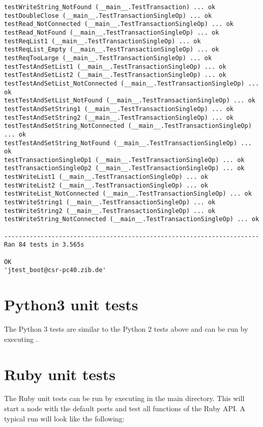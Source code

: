 \begin{lstlisting}[language={}]
testWriteString_NotFound (__main__.TestTransaction) ... ok
testDoubleClose (__main__.TestTransactionSingleOp) ... ok
testRead_NotConnected (__main__.TestTransactionSingleOp) ... ok
testRead_NotFound (__main__.TestTransactionSingleOp) ... ok
testReqList1 (__main__.TestTransactionSingleOp) ... ok
testReqList_Empty (__main__.TestTransactionSingleOp) ... ok
testReqTooLarge (__main__.TestTransactionSingleOp) ... ok
testTestAndSetList1 (__main__.TestTransactionSingleOp) ... ok
testTestAndSetList2 (__main__.TestTransactionSingleOp) ... ok
testTestAndSetList_NotConnected (__main__.TestTransactionSingleOp) ... ok
testTestAndSetList_NotFound (__main__.TestTransactionSingleOp) ... ok
testTestAndSetString1 (__main__.TestTransactionSingleOp) ... ok
testTestAndSetString2 (__main__.TestTransactionSingleOp) ... ok
testTestAndSetString_NotConnected (__main__.TestTransactionSingleOp) ... ok
testTestAndSetString_NotFound (__main__.TestTransactionSingleOp) ... ok
testTransactionSingleOp1 (__main__.TestTransactionSingleOp) ... ok
testTransactionSingleOp2 (__main__.TestTransactionSingleOp) ... ok
testWriteList1 (__main__.TestTransactionSingleOp) ... ok
testWriteList2 (__main__.TestTransactionSingleOp) ... ok
testWriteList_NotConnected (__main__.TestTransactionSingleOp) ... ok
testWriteString1 (__main__.TestTransactionSingleOp) ... ok
testWriteString2 (__main__.TestTransactionSingleOp) ... ok
testWriteString_NotConnected (__main__.TestTransactionSingleOp) ... ok

----------------------------------------------------------------------
Ran 84 tests in 3.565s

OK
'jtest_boot@csr-pc40.zib.de'
\end{lstlisting}

\section{Python3 unit tests}
The Python 3 tests are similar to the Python 2 tests above and can be run by
executing .

\section{Ruby unit tests}
The Ruby unit tests can be run by executing  in the
main directory. This will start a \scalaris{} node with the default ports and test
all functions of the Ruby API. A typical run will look like the
following:

